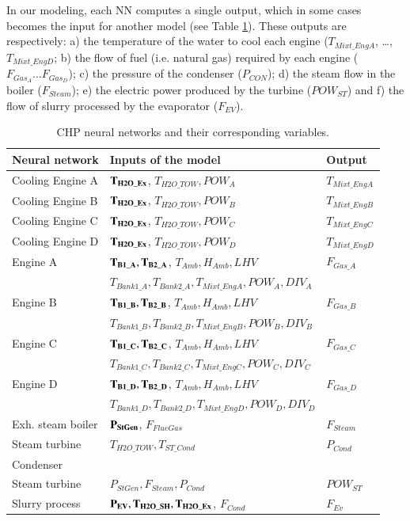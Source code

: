 In our modeling,  each NN computes a single output, which in some cases becomes the input for another model (see Table \ref{fignns}).  These outputs are respectively: a) the temperature of the water to cool each engine ($T_{Mixt\_EngA}$, \dots, $T_{Mixt\_EngD}$; b) the flow of fuel (i.e. natural gas) required by each engine ($F_{Gas_A} \dots F_{Gas_D}$); c) the pressure of the condenser ($P_{CON}$); d) the steam flow in the boiler ($F_{Steam}$); e) the electric power produced by the turbine ($POW_{ST}$) and f) the flow of slurry processed by the evaporator ($F_{EV}$).

\begin{table}[!t]
\caption{CHP neural networks and their corresponding variables.}
\label{fignns}
  \centering
\begin{tabular}{lll} \toprule
 Neural network  & Inputs of the model & Output \\ \midrule
Cooling Engine A & $\bf{T_{H2O\_Ex}}$, $T_{H2O\_TOW}, POW_A $ & $T_{Mixt\_EngA} $ \\
Cooling Engine B & $\bf{T_{H2O\_Ex}}$, $T_{H2O\_TOW}, POW_B $ & $T_{Mixt\_EngB} $ \\
Cooling Engine C & $\bf{T_{H2O\_Ex}}$, $T_{H2O\_TOW}, POW_C $ & $T_{Mixt\_EngC} $ \\
Cooling Engine D& $\bf{T_{H2O\_Ex}}$, $T_{H2O\_TOW}, POW_D $ & $T_{Mixt\_EngD} $ \\

 Engine A& $\bf{T_{B1\_A}, T_{B2\_A}}$, $T_{Amb}, H_{Amb}, LHV $ & $F_{Gas\_A} $ \\
 & $T_{Bank1\_A}, T_{Bank2\_A}, T_{Mixt\_EngA}, POW_A, DIV_A $ &  \\
 
 Engine B& $\bf{T_{B1\_B}, T_{B2\_B}}$, $T_{Amb}, H_{Amb}, LHV $ & $F_{Gas\_B} $ \\
 & $T_{Bank1\_B}, T_{Bank2\_B}, T_{Mixt\_EngB}, POW_B, DIV_B $ &  \\
 
 Engine C& $\bf{T_{B1\_C}, T_{B2\_C}}$, $T_{Amb}, H_{Amb}, LHV $ & $F_{Gas\_C} $ \\
 & $T_{Bank1\_C}, T_{Bank2\_C}, T_{Mixt\_EngC}, POW_C, DIV_C $ &  \\
 
 Engine D& $\bf{T_{B1\_D}, T_{B2\_D}}$, $T_{Amb}, H_{Amb}, LHV $ & $F_{Gas\_D} $ \\
 & $T_{Bank1\_D}, T_{Bank2\_D}, T_{Mixt\_EngD}, POW_D, DIV_D $ &  \\ 
 
Exh. steam boiler & $\bf{P_{StGen}}$, $F_{FlueGas}$ & $F_{Steam} $ \\
Steam turbine & $T_{H2O\_TOW}, T_{ST\_Cond}$ & $P_{Cond} $ \\
Condenser & & \\
Steam turbine & $P_{StGen}, F_{Steam}, P_{Cond}$ & $POW_{ST} $ \\
Slurry process & $\bf{P_{EV}, T_{H2O\_SH}, T_{H2O\_Ex}}$, $F_{Cond} $ & $F_{Ev}$ \\ \midrule


\end{tabular}
\vspace{-0.3cm}

\end{table}


